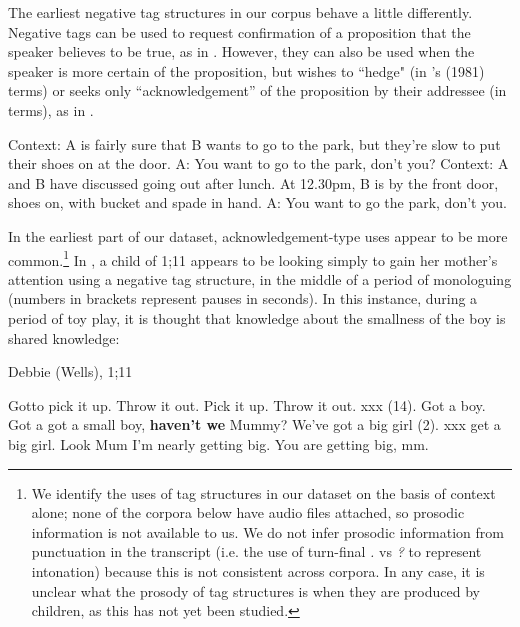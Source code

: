 \documentclass[output=paper,colorlinks,citecolor=brown]{langscibook}
\begin{document}
The earliest negative tag structures in our corpus behave a little differently. Negative tags can be used to request confirmation of a proposition that the speaker believes to be true, as in . However, they can also be used when the speaker is more certain of the proposition, but wishes to ``hedge" (in \citeauthor{ladd1981}'s (1981) terms) or seeks only ``acknowledgement'' of the proposition by their addressee (in  terms), as in .

\begin{exe}
    \ex Context: A is fairly sure that B wants to go to the park, but they're slow to put their shoes on at the door.
    \sn A: You want to go to the park, don't you?\label{tagparkrise}
    \ex Context: A and B have discussed going out after lunch. At 12.30pm, B is by the front door, shoes on, with bucket and spade in hand.
    \sn A: You want to go the park, don't you.\label{tagparkfall}
\end{exe}

In the earliest part of our dataset, acknowledgement-type uses appear to be more common.\footnote{We identify the uses of tag structures in our dataset on the basis of context alone; none of the corpora below have audio files attached, so prosodic information is not available to us. We do not infer prosodic information from punctuation in the transcript (i.e. the use of turn-final \textit{.} vs \textit{?} to represent intonation) because this is not consistent across corpora. In any case, it is unclear what the prosody of tag structures is when they are produced by children, as this has not yet been studied.} In , a child of 1;11 appears to be looking simply to gain her mother's attention using a negative tag structure, in the middle of a period of monologuing (numbers in brackets represent pauses in seconds). In this instance, during a period of toy play, it is thought that knowledge about the smallness of the boy is shared knowledge:

\begin{exe}
\ex Debbie (Wells), 1;11 \label{3:know}
\begin{xlist}
	Gotto pick it up. Throw it out. Pick it up. Throw it out. xxx (14). 
 	Got a boy. Got a got a small boy, \textbf{haven't we} Mummy?
 	We've got a big girl (2). xxx get a big girl. Look Mum I'm nearly getting big.
	You are getting big, mm.
\end{xlist}
\end{exe}
\end{document}
